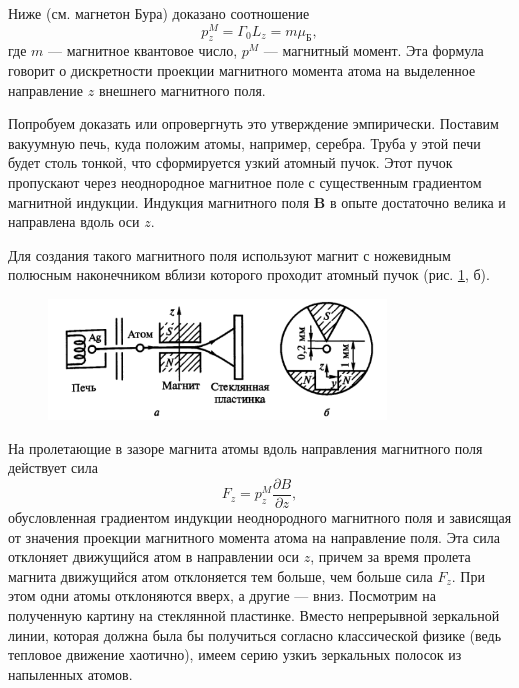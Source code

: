Ниже (см. магнетон Бура) доказано соотношение 
\[
  p^M_z = \Gamma_0L_z = m\mu_{\text{Б}},
\]
где $ m $ --- магнитное квантовое число, $ p^M $ --- магнитный момент. Эта
формула говорит о дискретности проекции магнитного момента атома на выделенное
направление $ z $ внешнего магнитного поля.

Попробуем доказать или опровергнуть это утверждение эмпирически. Поставим
вакуумную печь, куда положим атомы, например, серебра. Труба у этой печи будет
столь тонкой, что сформируется узкий атомный пучок. Этот пучок пропускают через
неоднородное 
магнитное поле с существенным градиентом магнитной индукции. 
Индукция магнитного поля $ \mathbf B $ в опыте достаточно велика и направлена
вдоль оси $ z $.

Для создания такого магнитного поля используют магнит с ножевидным полюсным наконечником вблизи которого проходит
атомный пучок (рис. \ref{fig:puchok}, б).

\begin{figure}[h]
  \centering
  \includegraphics[width=0.8\textwidth]{img/oral-05/puchok.png}
  \label{fig:puchok}
\end{figure}

На пролетающие в зазоре магнита атомы вдоль направления магнитного поля
действует сила  
\[
    F_z = p_z^M \frac{\partial B}{\partial z},
\]
обусловленная градиентом индукции неоднородного магнитного
поля и зависящая от значения проекции магнитного момента 
атома на направление поля. Эта сила отклоняет движущийся атом в
направлении оси $ z $, причем за время пролета магнита движущийся
атом отклоняется тем больше, чем больше сила $ F_z $. При этом одни
атомы отклоняются вверх, а другие --- вниз. Посмотрим на полученную картину на
стеклянной пластинке. Вместо непрерывной зеркальной линии, которая должна была бы
получиться согласно классической физике (ведь тепловое движение хаотично), имеем серию узкиъ зеркальных полосок из
напыленных атомов.

